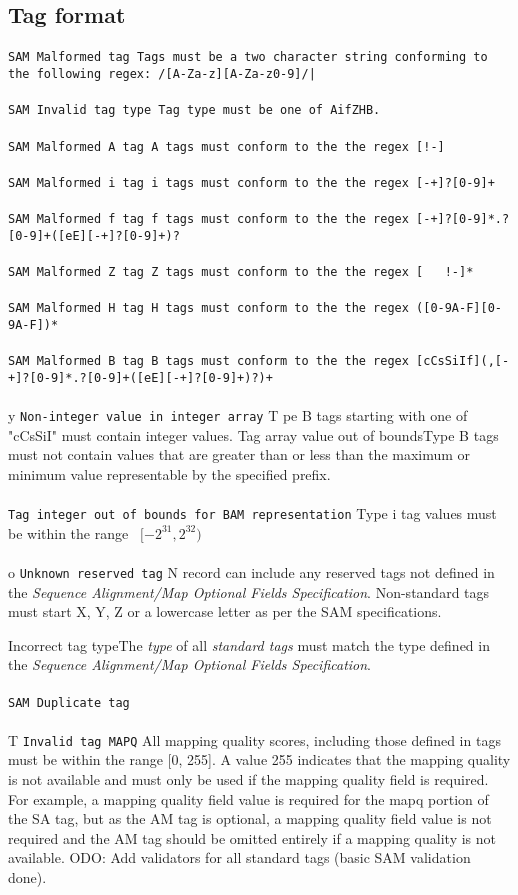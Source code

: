 \documentclass[10pt]{article}
\newcommand{\samrule}{\tt SAM}
\newcommand{\samstrictrule}[3]{
	\paragraph{} #3
	{\tt #1}
	#2
}
\begin{document}
\subsection{Tag format}
\samstrictrule{Malformed tag}{Tags must be a two character string conforming to the following regex: {\tt /[A-Za-z][A-Za-z0-9]/}|}{\samrule}
\samstrictrule{Invalid tag type}{Tag type must be one of AifZHB.}{\samrule}
\samstrictrule{Malformed A tag}{A tags must conform to the the regex {\tt [!-\char126]}}{\samrule}
\samstrictrule{Malformed i tag}{i tags must conform to the the regex {\tt [-+]?[0-9]+}}{\samrule}
\samstrictrule{Malformed f tag}{f tags must conform to the the regex {\tt [-+]?[0-9]*\char92.?[0-9]+([eE][-+]?[0-9]+)?}}{\samrule}
\samstrictrule{Malformed Z tag}{Z tags must conform to the the regex {\tt [\,\,\,!-\char126]*}}{\samrule}
\samstrictrule{Malformed H tag}{H tags must conform to the the regex {\tt ([0-9A-F][0-9A-F])*}}{\samrule}
\samstrictrule{Malformed B tag}{B tags must conform to the the regex {\tt [cCsSiIf](,[-+]?[0-9]*\char92.?[0-9]+([eE][-+]?[0-9]+)?)+}}{\samrule}
\samstrictrule{Non-integer value in integer array}{Type B tags starting with one of "cCsSiI" must contain integer values.}
\samstrictrule{Tag array value out of bounds}{Type B tags must not contain values that are greater than or less than the maximum or minimum value representable by the specified prefix.}
\samstrictrule{Tag integer out of bounds for BAM representation}{Type i tag values must be within the range {\tt ~$[-2^{31},2^{32})$}}{\bam}
\samstrictrule{Unknown reserved tag}{
	No record can include any reserved tags not defined in the
	{\sl Sequence Alignment/Map Optional Fields Specification}.
	Non-standard tags must start X, Y, Z or a lowercase letter as per the SAM specifications.
}
\samstrictrule{Incorrect tag type}{The \textit{type} of all \textit{standard tags} must match the type
defined in the {\sl Sequence Alignment/Map Optional Fields Specification}.}
\samstrictrule{Duplicate tag}{}{\samrule}
\samstrictrule{Invalid tag MAPQ}{All mapping quality scores, including those defined in tags must be within the range [0, 255].
A value 255 indicates that the mapping quality is not available and must only be used if the
mapping quality field is required. For example, a mapping quality field value is required for the mapq portion of the SA tag, but as the AM tag is optional, a mapping quality
field value is not required and the AM tag should be omitted entirely if a mapping quality is
not available.}


TODO: Add validators for all standard tags (basic SAM validation done).
\end{document}
